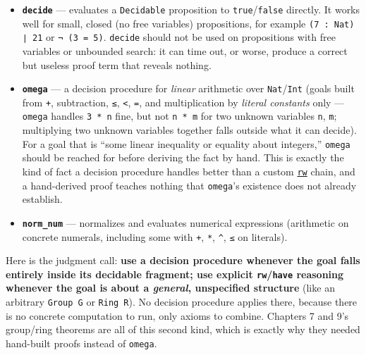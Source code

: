\begin{itemize}
\tightlist
\item
  \textbf{\texttt{decide}} --- evaluates a \texttt{Decidable} proposition to \texttt{true}/\texttt{false} directly. It works well for small, closed (no free variables) propositions, for example \texttt{(7 : Nat) ∣ 21} or \texttt{¬ (3 = 5)}. \texttt{decide} should not be used on propositions with free variables or unbounded search: it can time out, or worse, produce a correct but useless proof term that reveals nothing.
\item
  \textbf{\texttt{omega}} --- a decision procedure for \emph{linear} arithmetic over \texttt{Nat}/\texttt{Int} (goals built from \texttt{+}, subtraction, \texttt{≤}, \texttt{<}, \texttt{=}, and multiplication by \emph{literal constants} only --- \texttt{omega} handles \texttt{3 * n} fine, but not \texttt{n * m} for two unknown variables \texttt{n}, \texttt{m}; multiplying two unknown variables together falls outside what it can decide). For a goal that is ``some linear inequality or equality about integers,'' \texttt{omega} should be reached for before deriving the fact by hand. This is exactly the kind of fact a decision procedure handles better than a custom \href{https://lean-lang.org/doc/reference/latest/Tactic-Proofs/Tactic-Reference/}{\texttt{rw}} chain, and a hand-derived proof teaches nothing that \texttt{omega}'s existence does not already establish.
\item
  \textbf{\texttt{norm\_\allowbreak{}num}} --- normalizes and evaluates numerical expressions (arithmetic on concrete numerals, including some with \texttt{+}, \texttt{*}, \texttt{\^}, \texttt{≤} on literals).
\end{itemize}

Here is the judgment call: \textbf{use a decision procedure whenever the goal falls entirely inside its decidable fragment; use explicit \texttt{rw}/\texttt{have} reasoning whenever the goal is about a \emph{general}, unspecified structure} (like an arbitrary \texttt{Group G} or \texttt{Ring R}). No decision procedure applies there, because there is no concrete computation to run, only axioms to combine. Chapters 7 and 9's group/ring theorems are all of this second kind, which is exactly why they needed hand-built proofs instead of \texttt{omega}.

